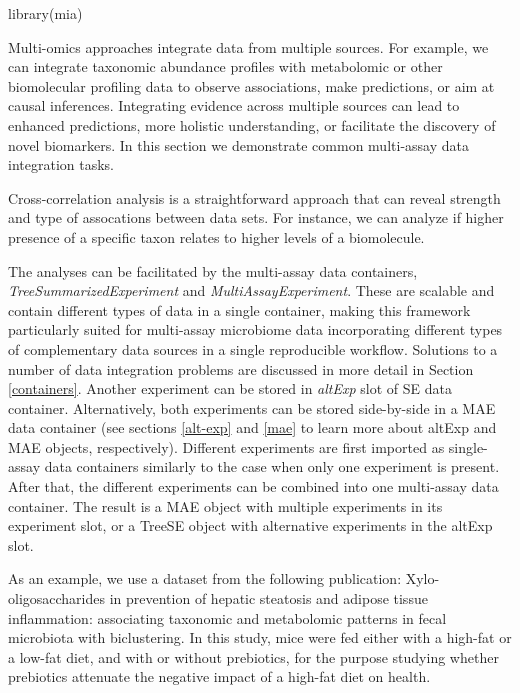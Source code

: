 \documentclass[
]{book}
\newenvironment{Shaded}{\begin{snugshade}}{\end{snugshade}}
\newcommand{\FunctionTok}[1]{\textcolor[rgb]{0.00,0.00,0.00}{#1}}
\newcommand{\NormalTok}[1]{#1}
\begin{document}
\begin{Shaded}
\begin{Highlighting}[]
\FunctionTok{library}\NormalTok{(mia)}
\end{Highlighting}
\end{Shaded}

Multi-omics approaches integrate data from multiple sources. For
example, we can integrate taxonomic abundance profiles with
metabolomic or other biomolecular profiling data to observe
associations, make predictions, or aim at causal
inferences. Integrating evidence across multiple sources can lead to
enhanced predictions, more holistic understanding, or facilitate the
discovery of novel biomarkers. In this section we demonstrate common
multi-assay data integration tasks.

Cross-correlation analysis is a straightforward approach that can
reveal strength and type of assocations between data sets. For instance,
we can analyze if higher presence of a specific taxon relates to higher
levels of a biomolecule.

The analyses can be facilitated by the multi-assay data containers,
\emph{TreeSummarizedExperiment} and \emph{MultiAssayExperiment}. These are
scalable and contain different types of data in a single container,
making this framework particularly suited for multi-assay microbiome
data incorporating different types of complementary data sources in a
single reproducible workflow. Solutions to a number of data
integration problems are discussed in more detail in Section
\ref{containers}. Another experiment can be stored in \emph{altExp} slot
of SE data container. Alternatively, both experiments can be stored
side-by-side in a MAE data container (see sections \ref{alt-exp} and \ref{mae}
to learn more about altExp and MAE objects, respectively). Different
experiments are first imported as single-assay data containers similarly to
the case when only one experiment is present. After that, the
different experiments can be combined into one multi-assay data
container. The result is a MAE object with multiple experiments in its
experiment slot, or a TreeSE object with alternative experiments in
the altExp slot.

As an example, we use a dataset from the following publication:
\citeyearpar{Hintikka2021} Xylo-oligosaccharides in prevention of hepatic
steatosis and adipose tissue inflammation: associating taxonomic and
metabolomic patterns in fecal microbiota with biclustering.
In this study, mice were fed either with a high-fat or a low-fat diet,
and with or without prebiotics, for the purpose studying whether prebiotics
attenuate the negative impact of a high-fat diet on health.
\end{document}
